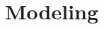 \documentclass{amsart}
\theoremstyle{definition}
\theoremstyle{remark}
\newcommand{\tql}{\textquotedblleft}
\newcommand{\tqr}{\textquotedblright}
\newcommand{\noin}{\noindent}
\begin{document}
%
%
%
%
%
%
%
%
%
%
%
%
%
%
%

\section{Modeling}\label{modeling}
\end{document}
